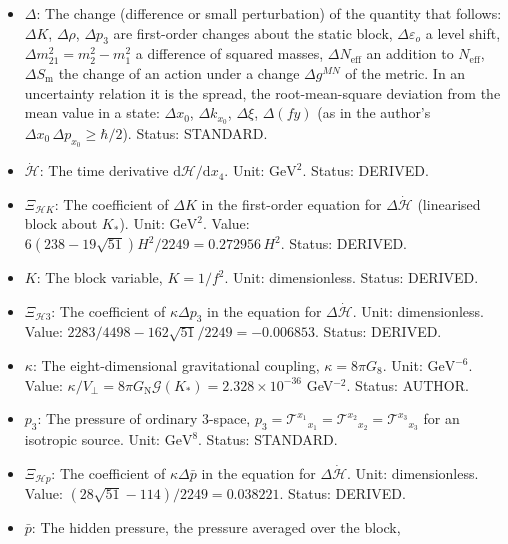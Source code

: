 \documentclass[
  10pt,
]{article}
\providecommand{\tightlist}{%
  \setlength{\itemsep}{0pt}\setlength{\parskip}{0pt}}
\begin{document}
\begin{itemize}
\tightlist
\item
  \(\Delta\): The change (difference or small perturbation) of the
  quantity that follows: \(\Delta K\), \(\Delta\rho\), \(\Delta p_3\)
  are first-order changes about the static block,
  \(\Delta\varepsilon_o\) a level shift,
  \(\Delta m^2_{21} = m_2^2 - m_1^2\) a difference of squared masses,
  \(\Delta N_{\mathrm{eff}}\) an addition to \(N_{\mathrm{eff}}\),
  \(\Delta S_{\mathrm{m}}\) the change of an action under a change
  \(\Delta g^{MN}\) of the metric. In an uncertainty relation it is the
  spread, the root-mean-square deviation from the mean value in a state:
  \(\Delta x_0\), \(\Delta k_{x_0}\), \(\Delta\xi\), \(\Delta(fy)\) (as
  in the author's \(\Delta x_0\,\Delta p_{x_0} \ge \hbar/2\)). Status:
  STANDARD.
\item
  \(\dot{\mathcal{H}}\): The time derivative
  \(\mathrm{d}\mathcal{H}/\mathrm{d}x_4\). Unit: \(\mathrm{GeV}^{2}\).
  Status: DERIVED.
\item
  \(\Xi_{\mathcal{H}K}\): The coefficient of \(\Delta K\) in the
  first-order equation for \(\Delta\dot{\mathcal{H}}\) (linearised block
  about \(K_*\)). Unit: \(\mathrm{GeV}^{2}\). Value:
  \(6(238 - 19\sqrt{51})H^2/2249 = 0.272956\,H^2\). Status: DERIVED.
\item
  \(K\): The block variable, \(K = 1/f^2\). Unit: dimensionless. Status:
  DERIVED.
\item
  \(\Xi_{\mathcal{H}3}\): The coefficient of \(\kappa\Delta p_3\) in the
  equation for \(\Delta\dot{\mathcal{H}}\). Unit: dimensionless. Value:
  \(2283/4498 - 162\sqrt{51}/2249 = -0.006853\). Status: DERIVED.
\item
  \(\kappa\): The eight-dimensional gravitational coupling,
  \(\kappa = 8\pi G_8\). Unit: \(\mathrm{GeV}^{-6}\). Value:
  \(\kappa/V_\perp = 8\pi G_{\mathrm{N}}\mathcal{G}(K_*) = 2.328\times10^{-36}\)
  GeV\(^{-2}\). Status: AUTHOR.
\item
  \(p_3\): The pressure of ordinary 3-space,
  \(p_3 = \mathcal{T}^{x_1}{}_{x_1} = \mathcal{T}^{x_2}{}_{x_2} = \mathcal{T}^{x_3}{}_{x_3}\)
  for an isotropic source. Unit: \(\mathrm{GeV}^{8}\). Status: STANDARD.
\item
  \(\Xi_{\mathcal{H}p}\): The coefficient of \(\kappa\Delta\bar p\) in
  the equation for \(\Delta\dot{\mathcal{H}}\). Unit: dimensionless.
  Value: \((28\sqrt{51} - 114)/2249 = 0.038221\). Status: DERIVED.
\item
  \(\bar p\): The hidden pressure, the pressure averaged over the block,

\end{itemize}
\end{document}
